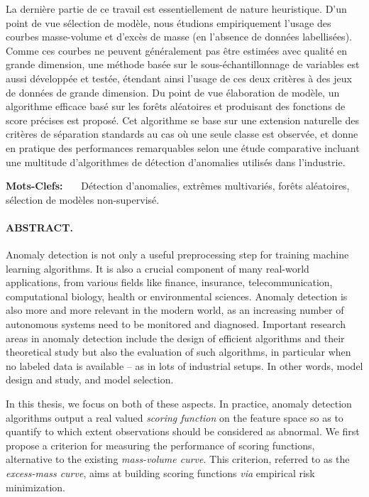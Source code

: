 \documentclass[a4paper, 8pt]{article}
\begin{document}
La dernière partie de ce travail est essentiellement de nature heuristique. D'un point de vue sélection de modèle, nous étudions empiriquement l'usage des courbes masse-volume et d'excès de masse (en l'absence de données labellisées). Comme ces courbes ne peuvent généralement pas être estimées avec qualité en grande dimension, une méthode basée sur le sous-échantillonnage de variables est aussi développée et testée, étendant ainsi l'usage de ces deux critères à des jeux de données de grande dimension. Du point de vue élaboration de modèle, un algorithme efficace basé sur les forêts aléatoires et produisant des fonctions de score précises est proposé. Cet algorithme se base sur une extension naturelle des critères de séparation standards au cas où une seule classe est observée, et donne en pratique des performances remarquables selon une étude comparative incluant une multitude d'algorithmes de détection d'anomalies utilisés dans l'industrie.
\vspace{0.5em}

\textbf{Mots-Clefs:} ~~~Détection d'anomalies, extrêmes multivariés, forêts aléatoires, sélection de modèles non-supervisé.

\vspace{0.7em}

\paragraph{ABSTRACT.}


Anomaly detection is not only a useful preprocessing step for training machine learning algorithms. It is also a crucial component of many real-world applications, from various fields like finance, insurance, telecommunication, computational biology, health or environmental sciences. Anomaly detection is also more and more relevant in the modern world, as an increasing number of autonomous systems need to be monitored and diagnosed. Important research areas in anomaly detection include the design of efficient algorithms and their theoretical study but also the evaluation of such algorithms, in particular when no labeled data is available -- as in lots of industrial setups. 
In other words, model design and study, and model selection.

In this thesis, we focus on both of these aspects. In practice, anomaly detection algorithms output a real valued \emph{scoring function} on the feature space so as to quantify to which extent observations should be considered as abnormal. We first propose a criterion for measuring the performance of scoring functions, alternative to the existing \emph{mass-volume curve}. This criterion, referred to as the \emph{excess-mass curve}, aims at building scoring functions \emph{via} empirical risk minimization.
\end{document}
